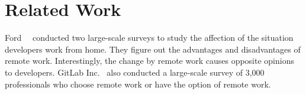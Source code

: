 \section{Related Work}
\label{sec:relate}

Ford~\et~\citep{ford2021TOSEM} conducted 
two large-scale surveys to study the affection of 
the situation developers work from home. 
They figure out the advantages and disadvantages of 
remote work. 
Interestingly, the change by remote work causes opposite opinions 
to developers. 
GitLab Inc.~\citep{gitlab2020survey} also conducted
a large-scale survey of 3,000 professionals 
who choose remote work or have the option of remote work. 

